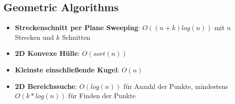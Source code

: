 \subsection{Geometric Algorithms}%
\label{lz:sub:geometric_algorithms}

\begin{itemize}
	\item \textbf{Streckenschnitt per Plane Sweeping}: $O((n + k) log (n))$ mit $n$ Strecken und $k$ Schnitten
	\item \textbf{2D Konvexe Hülle}: $O(sort(n))$
	\item \textbf{Kleinste einschließende Kugel}: $O(n)$
	\item \textbf{2D Bereichssuche}: $O(log (n))$ für Anzahl der Punkte, mindestens $O(k * log (n))$ für Finden der Punkte
\end{itemize}